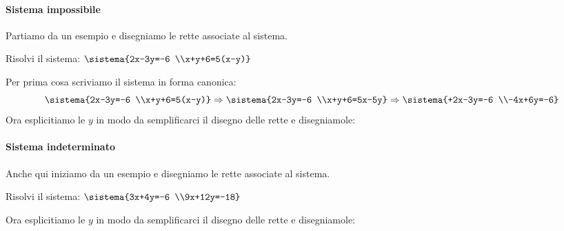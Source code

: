 \paragraph{Sistema impossibile}

Partiamo da un esempio e disegniamo le rette associate al sistema.

 \begin{esempio}{}{}
Risolvi il sistema: \quad 
\(\sistema{2x-3y=-6 \\x+y+6=5(x-y)}\)

\medskip
Per prima cosa scriviamo il sistema in forma canonica:
\[
\sistema{2x-3y=-6 \\x+y+6=5(x-y)}\Rightarrow
\sistema{2x-3y=-6 \\x+y+6=5x-5y}\Rightarrow
\sistema{+2x-3y=-6 \\-4x+6y=-6}
\]
Ora esplicitiamo le \(y\) in modo da semplificarci il disegno delle rette e 
disegniamole:

\end{esempio}

\paragraph{Sistema indeterminato}

Anche qui iniziamo da un esempio e disegniamo le rette associate al sistema.

 \begin{esempio}{}{}
Risolvi il sistema: \quad 
\(\sistema{3x+4y=-6 \\9x+12y=-18}\)

\medskip
Ora esplicitiamo le \(y\) in modo da semplificarci il disegno delle rette e 
disegniamole:


\end{esempio}


